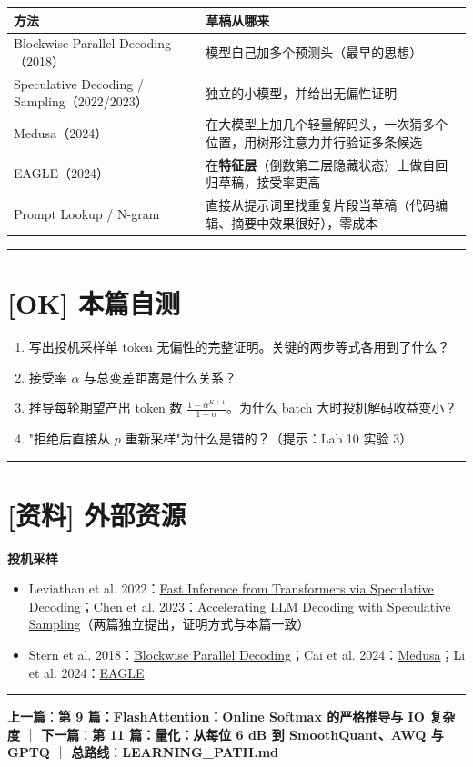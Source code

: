 \begin{center}
\small
\begin{tabularx}{\textwidth}{p{3.5cm} X}
\toprule
\textbf{方法} & \textbf{草稿从哪来} \\
\midrule
Blockwise Parallel Decoding（2018） & 模型自己加多个预测头（最早的思想） \\
Speculative Decoding / Sampling（2022/2023） & 独立的小模型，并给出无偏性证明 \\
Medusa（2024） & 在大模型上加几个轻量解码头，一次猜多个位置，用树形注意力并行验证多条候选 \\
EAGLE（2024） & 在\textbf{特征层}（倒数第二层隐藏状态）上做自回归草稿，接受率更高 \\
Prompt Lookup / N-gram & 直接从提示词里找重复片段当草稿（代码编辑、摘要中效果很好），零成本 \\
\bottomrule
\end{tabularx}
\end{center}

\vspace{0.8em}\hrule\vspace{0.8em}

\section{[OK] 本篇自测}

\begin{enumerate}
  \item 写出投机采样单 token 无偏性的完整证明。关键的两步等式各用到了什么？
  \item 接受率 $\alpha$ 与总变差距离是什么关系？
  \item 推导每轮期望产出 token 数 $\frac{1-\alpha^{K+1}}{1-\alpha}$。为什么 batch 大时投机解码收益变小？
  \item "拒绝后直接从 $p$ 重新采样"为什么是错的？（提示：Lab 10 实验 3）
\end{enumerate}

\vspace{0.8em}\hrule\vspace{0.8em}

\section{[资料] 外部资源}

\textbf{投机采样}
\begin{itemize}
  \item Leviathan et al. 2022：\href{https://arxiv.org/abs/2211.17192}{Fast Inference from Transformers via Speculative Decoding}；Chen et al. 2023：\href{https://arxiv.org/abs/2302.01318}{Accelerating LLM Decoding with Speculative Sampling}（两篇独立提出，证明方式与本篇一致）
  \item Stern et al. 2018：\href{https://arxiv.org/abs/1811.03115}{Blockwise Parallel Decoding}；Cai et al. 2024：\href{https://arxiv.org/abs/2401.10774}{Medusa}；Li et al. 2024：\href{https://arxiv.org/abs/2401.15077}{EAGLE}
\end{itemize}

\vspace{0.8em}\hrule\vspace{0.8em}

\textbf{上一篇}：\textbf{第 9 篇：FlashAttention：Online Softmax 的严格推导与 IO 复杂度} ｜ \textbf{下一篇}：\textbf{第 11 篇：量化：从每位 6 dB 到 SmoothQuant、AWQ 与 GPTQ} ｜ \textbf{总路线}：\textbf{LEARNING\_PATH.md}
